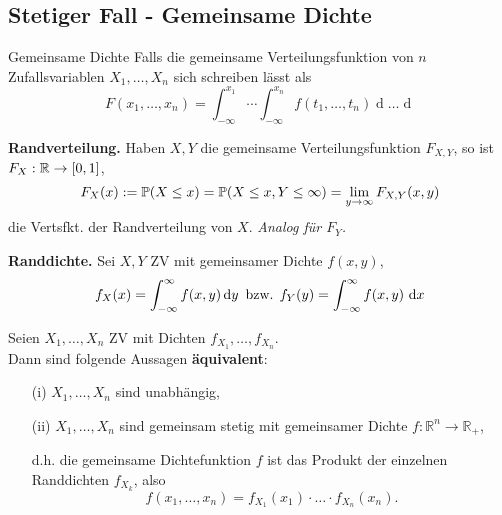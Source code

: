 \subsection{Stetiger Fall - Gemeinsame Dichte}
\begin{mainbox}{Gemeinsame Dichte}
    Falls die gemeinsame Verteilungsfunktion von $n$ Zufallsvariablen $X_1, \ldots, X_n$ sich schreiben lässt als
    $$F(x_1, \ldots, x_n) = \int_{-\infty}^{x_1} \cdots \int_{-\infty}^{x_n}f(t_1, \ldots, t_n) \mathop{dt_n}\ldots\mathop{dt_1}$$
\end{mainbox}
\textbf{Randverteilung.} Haben $X, Y$ die gemeinsame Verteilungsfunktion $F_{X,Y}$, so ist $F_X: \R \to [0,1]$,
$$F_X(x) := \P(X \leq x) = \P(X \leq x, Y \leq \infty) = \lim_{y \to \infty}F_{X,Y}(x,y)$$
die Vertsfkt. der Randverteilung von $X$. \textit{Analog für $F_Y$.}

\textbf{Randdichte.} Sei $X,Y$ ZV mit gemeinsamer Dichte $f(x,y)$,
    $$f_X(x) = \int_{-\infty}^{\infty}f(x,y)\mathop{\text{d}y} \text{ bzw. } f_Y(y)=\int_{-\infty}^{\infty}f(x,y)\dx$$

Seien $X_1, \ldots, X_n$ ZV mit Dichten $f_{X_1}, \ldots, f_{X_n}$. \\
Dann sind folgende Aussagen \textbf{äquivalent}:
\begin{itemize}
    \item[(i)] $X_1, \ldots, X_n$ sind unabhängig,
    \item[(ii)] $X_1, \ldots, X_n$ sind gemeinsam stetig mit gemeinsamer Dichte $f: \mathbb{R}^n \rightarrow \mathbb{R}_{+}$,
    \item[]\hspace{1cm}d.h. die gemeinsame Dichtefunktion $f$ ist das Produkt der einzelnen Randdichten $f_{X_k}$, also
    $$
    f\left(x_1, \ldots, x_n\right)=f_{X_1}\left(x_1\right) \cdot \ldots \cdot f_{X_n}\left(x_n\right).
    $$
\end{itemize}
